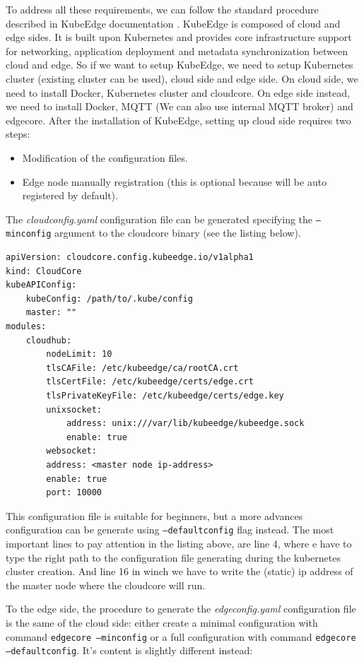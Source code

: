 To address all these requirements, we can follow the standard procedure described in KubeEdge documentation \cite{kubeedgedoc}.
KubeEdge is composed of cloud and edge sides. It is built upon Kubernetes and provides core infrastructure support for networking, application deployment and metadata synchronization between cloud and edge. So if we want to setup KubeEdge, we need to setup Kubernetes cluster (existing cluster can be used), cloud side and edge side.
On cloud side, we need to install Docker, Kubernetes cluster and cloudcore. On edge side instead, we need to install Docker, MQTT (We can also use internal MQTT broker) and edgecore. 
After the installation of KubeEdge, setting up cloud side requires two steps: 
\begin{itemize}
	\item Modification of the configuration files.
	\item Edge node manually registration (this is optional because will be auto registered by default).
\end{itemize}

The \textit{cloudconfig.yaml} configuration file can be generated specifying the \texttt{--minconfig} argument to the cloudcore binary (see the listing below).
\begin{verbatim}
apiVersion: cloudcore.config.kubeedge.io/v1alpha1
kind: CloudCore
kubeAPIConfig:
    kubeConfig: /path/to/.kube/config
    master: ""
modules:
    cloudhub:
        nodeLimit: 10
        tlsCAFile: /etc/kubeedge/ca/rootCA.crt
        tlsCertFile: /etc/kubeedge/certs/edge.crt
        tlsPrivateKeyFile: /etc/kubeedge/certs/edge.key
        unixsocket:
            address: unix:///var/lib/kubeedge/kubeedge.sock
            enable: true
        websocket:
        address: <master node ip-address>
        enable: true
        port: 10000
\end{verbatim}


This configuration file is suitable for beginners, but a more advances configuration can be generate using \texttt{--defaultconfig} flag instead.
The most important lines to pay attention in the listing above, are line 4, where e have to type the right path to the configuration file generating during the kubernetes cluster creation. And line 16 in winch we have to write the (static) ip address of the master node where the cloudcore will run.

To the edge side, the procedure to generate the \textit{edgeconfig.yaml} configuration file is the same of the cloud side: either create a minimal configuration with command \texttt{edgecore --minconfig} or a full configuration with command \texttt{edgecore --defaultconfig}. It's content is slightly different instead:


